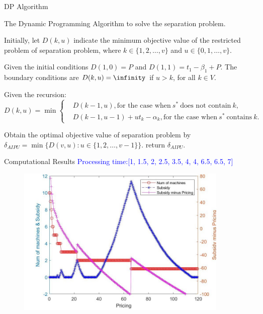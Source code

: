 \documentclass[14pt]{beamer}
\begin{document}
\begin{frame}{DP Algorithm}
	\begin{block}
		{The Dynamic Programming Algorithm to solve the separation problem.}
	\end{block}
	\begin{description}
	\justifying
	\footnotesize
	\item[Step 1.] Initially, let $D(k,u)$ indicate the minimum objective value of the restricted problem of separation problem, where $k\in \{1,2,\ldots,v\}$ and $u\in \{0,1,\ldots,v\}$.
	\item[Step 2.] Given the initial conditions $D(1,0) = P$ and $D(1,1) = t_1 - \beta_1 +P$. The boundary conditions are $D(k,u) = \infinity$ if $u > k$, for all $k \in V$.
	\item[Step 3.] Given the recursion:
	\begin{equation*}
	D(k,u)= \min \left\{
	\begin{aligned}
	& D(k-1,u), \text{for the case when} \ s^* \ \text{does not contain} \ k, \\
	& D(k-1,u-1) + u t_k - \alpha_k ,\text{for the case when} \ s^* \ \text{contains} \ k.
	\end{aligned}
	\right.
	\end{equation*}

\item[Step 4.] Obtain the optimal objective value of separation problem by
$\delta_{AIPU} = \min\{D(v,u): u\in \{1,2,\ldots,v-1\}\}$.
 return $\delta_{AIPU}$.
\end{description}

\end{frame}

\begin{frame}{Computational Results}
	\small
	\centering
	\textcolor{blue}{Processing time:[1, 1.5, 2, 2.5, 3.5, 4, 4, 6.5, 6.5, 7]}
	\vspace{-3mm}
	\begin{figure}[H]
	\centering
	\includegraphics[width=0.9\textwidth]{Figures/Image2}
	\end{figure}
	\centering
\end{frame}
\end{document}
